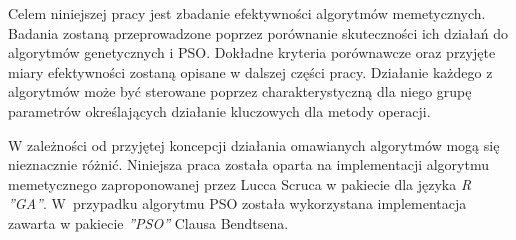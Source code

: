 \par
Celem niniejszej pracy jest zbadanie efektywności algorytmów memetycznych. Badania zostaną przeprowadzone poprzez porównanie skuteczności ich działań do algorytmów genetycznych i PSO. Dokładne kryteria porównawcze oraz przyjęte miary efektywności zostaną opisane w dalszej części pracy. Działanie każdego z algorytmów może być sterowane poprzez charakterystyczną dla niego grupę parametrów określających działanie kluczowych dla metody operacji. 
\par
W zależności od przyjętej koncepcji działania omawianych algorytmów mogą się nieznacznie różnić. Niniejsza praca została oparta na implementacji algorytmu memetycznego zaproponowanej przez Lucca Scruca w pakiecie dla języka \emph{R ''GA''}\cite{gaPackage}. W~przypadku algorytmu PSO została wykorzystana implementacja zawarta w pakiecie \emph{''PSO''} Clausa Bendtsena\cite{psoPackage}. 

